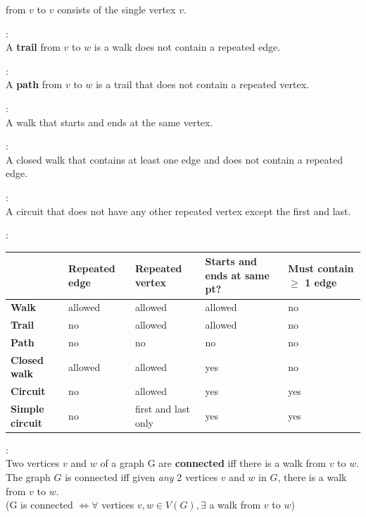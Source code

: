 \documentclass[10pt,landscape,a4paper]{article}
\newenvironment{descitemize} %
{\begin{description}[leftmargin=*,before=\let\makelabel\descitemlabel]}
	{\end{description}}
\newcommand{\descitemlabel}[1]{%
	\textbullet\ \textbf{#1}%
}
\begin{document}
\begin{multicols*}{4}
\begin{descitemize}
				\item [Trivial Walk] from $v$ to $v$ consists of the single vertex $v$.
				
				\item [Trail]:\\
				A \textbf{trail} from $v$ to $w$ is a walk does not contain a repeated edge.
				
				\item [Path]:\\
				A \textbf{path} from $v$ to $w$ is a trail that does not contain a repeated vertex.
				
				\item [Closed Walk]:\\
				A walk that starts and ends at the same vertex.
				
				\item [Circuit (Cycle)]:\\
				A closed walk that contains at least one edge and does not contain a repeated edge.
				
				\item [Simple Circuit]:\\
				A circuit that does not have any other repeated vertex except the first and last.
				
				\item [Summary]:\\
				\begin{tabularx}{\columnwidth}{|X|X|X|X|X|}
				\hline
				& Repeated edge & Repeated vertex & Starts and ends at same pt? & Must contain $\geq$ 1 edge\\ \hline
				\textbf{Walk} & allowed & allowed & allowed & no \\ \hline
				\textbf{Trail} & no & allowed & allowed & no\\ \hline
				\textbf{Path} & no & no & no & no \\ \hline
				\textbf{Closed walk} & allowed & allowed & yes & no\\ \hline
				\textbf{Circuit} & no & allowed & yes & yes\\ \hline
				\textbf{Simple circuit} & no & first and last only & yes & yes \\ \hline
				
				\end{tabularx}
				
				\item [Connectedness]:\\
				Two vertices $v$ and $w$ of a graph G are \textbf{connected} iff there is a walk from $v$ to $w$.\\
				The graph $G$ is connected iff given \textit{any} 2 vertices $v$ and $w$ in $G$, there is a walk from $v$ to $w$. \\
				(G is connected $\Leftrightarrow \forall$ vertices $v,w\in V(G),\exists$ a walk from $v$ to $w$)
				

\end{descitemize}
\end{multicols*}
\end{document}
